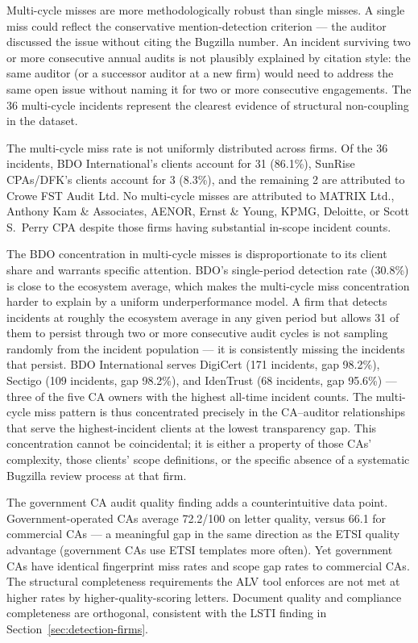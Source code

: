 \documentclass[10pt,twocolumn,letterpaper]{article}
\begin{document}
Multi-cycle misses are more methodologically robust than single misses.
A single miss could reflect the conservative mention-detection criterion
--- the auditor discussed the issue without citing the Bugzilla number.
An incident surviving two or more consecutive annual audits is not
plausibly explained by citation style: the same auditor (or a successor
auditor at a new firm) would need to address the same open issue without
naming it for two or more consecutive engagements. The 36 multi-cycle
incidents represent the clearest evidence of structural non-coupling
in the dataset.

The multi-cycle miss rate is not uniformly distributed across firms.
Of the 36 incidents, BDO International's clients account for 31 (86.1\%),
SunRise CPAs/DFK's clients account for 3 (8.3\%), and the remaining
2 are attributed to Crowe FST Audit Ltd. No multi-cycle misses are
attributed to MATRIX Ltd., Anthony Kam \& Associates, AENOR, Ernst \&
Young, KPMG, Deloitte, or Scott S.\ Perry CPA despite those firms having
substantial in-scope incident counts.

The BDO concentration in multi-cycle misses is disproportionate to its
client share and warrants specific attention. BDO's single-period
detection rate (30.8\%) is close to the ecosystem average, which makes
the multi-cycle miss concentration harder to explain by a uniform
underperformance model. A firm that detects incidents at roughly the
ecosystem average in any given period but allows 31 of them to persist
through two or more consecutive audit cycles is not sampling randomly
from the incident population --- it is consistently missing the
incidents that persist. BDO International serves DigiCert (171
incidents, gap 98.2\%), Sectigo (109 incidents, gap 98.2\%), and
IdenTrust (68 incidents, gap 95.6\%) --- three of the five CA owners
with the highest all-time incident counts. The multi-cycle miss pattern
is thus concentrated precisely in the CA--auditor relationships that
serve the highest-incident clients at the lowest transparency gap. This
concentration cannot be coincidental; it is either a property of those
CAs' complexity, those clients' scope definitions, or the specific
absence of a systematic Bugzilla review process at that firm.

The government CA audit quality finding adds a counterintuitive data
point. Government-operated CAs average 72.2/100 on letter quality,
versus 66.1 for commercial CAs --- a meaningful gap in the same
direction as the ETSI quality advantage (government CAs use ETSI
templates more often). Yet government CAs have identical fingerprint
miss rates and scope gap rates to commercial CAs. The structural
completeness requirements the ALV tool enforces are not met at higher
rates by higher-quality-scoring letters. Document quality and
compliance completeness are orthogonal, consistent with the LSTI
finding in Section~\ref{sec:detection-firms}.
\end{document}
